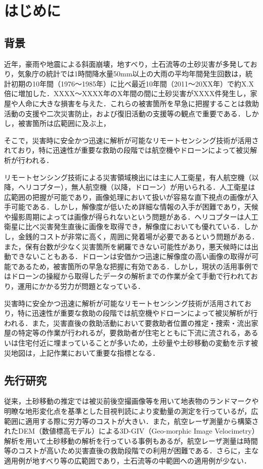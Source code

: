 \chapter{はじめに}
  \section{背景}
    近年，豪雨や地震による斜面崩壊，地すべり，土石流等の土砂災害が多発しており，気象庁の統計では1時間降水量50mm以上の大雨の平均年間発生回数は，統計初期の10年間（1976〜1985年）に比べ最近10年間（2011〜20XX年）で約X.X倍に増加した\cite{背景1}．XXXX〜XXXX年のX年間の間に土砂災害がXXXX件発生し，家屋や人命に大きな損害を与えた．これらの被害箇所を早急に把握することは救助活動の支援や二次災害防止，および復旧活動の支援等の観点で重要である\cite{}．しかし，被害箇所は広範囲に及ぶ上，


    そこで，災害時に安全かつ迅速に解析が可能なリモートセンシング技術が活用されており，特に迅速性が重要な救助の段階では航空機やドローンによって被災解析が行われる\cite{}．

    リモートセンシング技術による災害領域検出には主に人工衛星，有人航空機（以降，ヘリコプター），無人航空機（以降，ドローン）が用いられる．人工衛星は広範囲の把握が可能であり，画像処理において扱いが容易な直下視点の画像が入手可能である．しかし，解像度が低いため詳細な情報の入手が困難であり，天候や撮影周期によっては画像が得られないという問題がある．ヘリコプターは人工衛星に比べ災害発生直後に画像を取得でき，解像度においても優れている．しかし，金銭的コストが非常に高く，周囲に発着場が必要であるという問題がある．また，保有台数が少なく災害箇所を網羅できない可能性があり，悪天候時には出動できないこともある．ドローンは安価かつ迅速に解像度の高い画像の取得が可能であるため，被害箇所の早急な把握に有効である．しかし，現状の活用事例ではドローンの操縦から取得したデータの解析までの作業が全て手動で行われており，運用にかかる労力が問題となっている．

    災害時に安全かつ迅速に解析が可能なリモートセンシング技術が活用されており，特に迅速性が重要な救助の段階では航空機やドローンによって被災解析が行われる．また，災害直後の救助活動において要救助者位置の推定・捜索・流出家屋の特定等の作業が行われるが，要救助者が住宅とともに下流に流される，あるいは住宅付近に埋まっていることが多いため，土砂量や土砂移動の変動を示す被災地図は，上記作業において重要な指標となる．


  \section{先行研究}
    従来，土砂移動の推定では被災前後空撮画像等を用いて地表物のランドマークや明瞭な地形変化点を基準とした目視判読により変動量の測定を行っているが\cite{先行研究1}，広範囲に適用する際に労力等のコストが大きい．また，航空レーザ測量から構築されたDEM（数値標高モデル）による3D-GIV（Geo-morphic Image Velocimetry）解析を用いて土砂移動の解析を行っている事例もあるが\cite{先行研究2}，航空レーザ測量は時間等のコストが高いため災害直後の救助段階での利用が困難である．さらに，主な適用例が地すべり等の広範囲であり，土石流等の中範囲への適用例が少ない．


